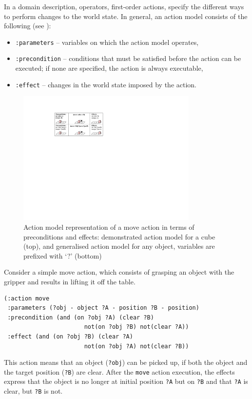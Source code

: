 In a domain description, operators, \ie first-order actions, specify the different ways to perform changes to the world state. 
In general, an action model consists of the following (see ):
\begin{itemize}
	\item \texttt{:parameters} -- variables on which the action model operates,
	\item \texttt{:precondition} -- conditions that must be satisfied before the action can be executed; if none are specified, the action is always executable,
	\item \texttt{:effect} -- changes in the world state imposed by the action.
\end{itemize}

\begin{figure}[h]
	\centering
	\includegraphics[width=0.8\textwidth]{figures/schema-logic}
	\caption{Action model representation of a move action in terms of preconditions and effects: demonstrated action model for a cube (top), and generalised action model for any object, variables are prefixed with `?' (bottom)}
	\label{fig:action model}
\end{figure}

Consider a simple move action, which consists of grasping an object with the gripper and results in lifting it off the table.
\begin{verbatim}
(:action move
 :parameters (?obj - object ?A - position ?B - position)
 :precondition (and (on ?obj ?A) (clear ?B)
                       not(on ?obj ?B) not(clear ?A))
 :effect (and (on ?obj ?B) (clear ?A)
                       not(on ?obj ?A) not(clear ?B))
\end{verbatim}

This action means that an object (\texttt{?obj}) can be picked up, if both the object and the target position (\texttt{?B}) are clear.
After the \texttt{move} action execution, the effects express that the object is no longer at initial position \texttt{?A} but on \texttt{?B} and that \texttt{?A} is clear, but \texttt{?B} is not.


